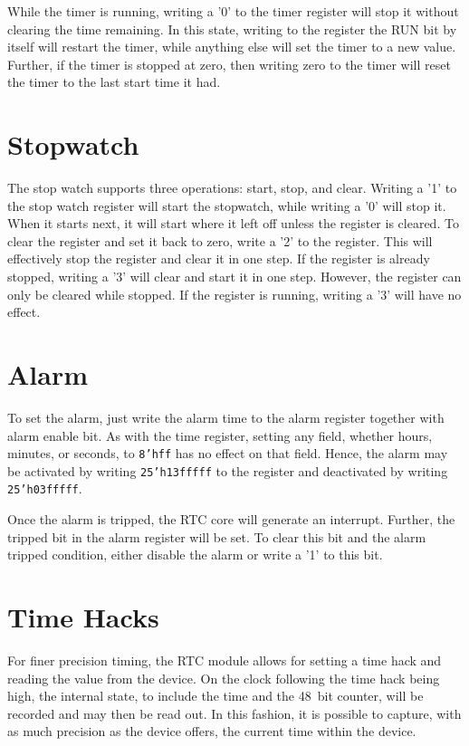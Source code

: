 \documentclass{gqtekspec}
\begin{document}
While the timer is running, writing a '0' to the timer register will stop it
without clearing the time remaining.  In this state, writing to the register
the RUN bit by itself will restart the timer, while anything else will set the
timer to a new value.  Further, if the timer is stopped at zero, then writing
zero to the timer will reset the timer to the last start time it had.

\section{Stopwatch}
The stop watch supports three operations: start, stop, and clear.  Writing a
'1' to the stop watch register will start the stopwatch, while writing a '0'
will stop it.  When it starts next, it will start where it left off unless the
register is cleared.  To clear the register and set it back to zero, write a
'2' to the register.  This will effectively stop the register and clear it in
one step.  If the register is already stopped, writing a '3' will clear and
start it in one step.  However, the register can only be cleared while stopped.
If the register is running, writing a '3' will have no effect.

\section{Alarm}
To set the alarm, just write the alarm time to the alarm register together
with alarm enable bit.  As with the time register, setting any field,
whether hours, minutes, or seconds, to {\tt 8'hff} has no effect on that
field.  Hence, the alarm may be activated by writing {\tt 25'h13fffff} to
the register and deactivated by writing {\tt 25'h03fffff}.

Once the alarm is tripped, the RTC core will generate an interrupt.  Further,
the tripped bit in the alarm register will be set.  To clear this bit and the
alarm tripped condition, either disable the alarm or write a '1' to this bit.

\section{Time Hacks}

For finer precision timing, the RTC module allows for setting a time
hack and reading the value from the device.  On the clock following the
time hack being high, the internal state, to include the time and the 48~bit
counter, will be recorded and may then be read out.  In this fashion,
it is possible to capture, with as much precision as the device offers,
the current time within the device.
\end{document}
